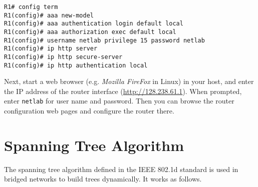\documentclass{../UTNetLab}
\begin{document}
    \begin{lstlisting}[language={cisco},emph={netlab}]
R1# config term
R1(config)# aaa new-model
R1(config)# aaa authentication login default local
R1(config)# aaa authorization exec default local
R1(config)# username netlab privilege 15 password netlab
R1(config)# ip http server
R1(config)# ip http secure-server
R1(config)# ip http authentication local
    \end{lstlisting}
    
    Next, start a web browser (e.g. \textit{Mozilla FireFox} in Linux) in your host, and enter the IP address of the router interface (\url{http://128.238.61.1}).
    When prompted, enter \texttt{netlab} for user name and password.
    Then you can browse the router configuration web pages and configure the router there.


\newpage
\appendix

\section{Spanning Tree Algorithm}
\label{appendix:spanningTree}
    The spanning tree algorithm defined in the IEEE 802.1d standard is used in bridged networks to build trees dynamically.
    It works as follows.
\end{document}
